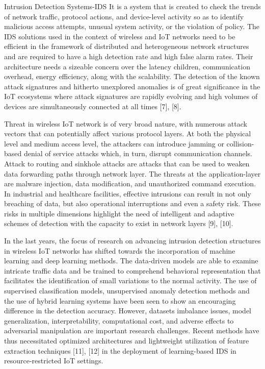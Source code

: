 \documentclass[12pt]{article}
\begin{document}
Intrusion Detection Systems-IDS It is a system that is created to check the trends of network traffic, protocol actions, and device-level activity so as to identify malicious access attempts, unusual system activity, or the violation of policy. The IDS solutions used in the context of wireless and IoT networks need to be efficient in the framework of distributed and heterogeneous network structures and are required to have a high detection rate and high false alarm rates. Their architecture needs a sizeable concern over the latency children, communication overhead, energy efficiency, along with the scalability. The detection of the known attack signatures and hitherto unexplored anomalies is of great significance in the IoT ecosystems where attack signatures are rapidly evolving and high volumes of devices are simultaneously connected at all times [7], [8].



Threat in wireless IoT network is of very broad nature, with numerous attack vectors that can potentially affect various protocol layers. At both the physical level and medium access level, the attackers can introduce jamming or collision-based denial of service attacks which, in turn, disrupt communication channels. Attack to routing and sinkhole attacks are attacks that can be used to weaken data forwarding paths through network layer. The threats at the application-layer are malware injection, data modification, and unauthorized command execution. In industrial and healthcare facilities, effective intrusions can result in not only breaching of data, but also operational interruptions and even a safety risk. These risks in multiple dimensions highlight the need of intelligent and adaptive schemes of detection with the capacity to exist in network layers [9], [10].



In the last years, the focus of research on advancing intrusion detection structures in wireless IoT networks has shifted towards the incorporation of machine learning and deep learning methods. The data-driven models are able to examine intricate traffic data and be trained to comprehend behavioral representation that facilitates the identification of small variations to the normal activity. The use of supervised classification models, unsupervised anomaly detection methods and the use of hybrid learning systems have been seen to show an encouraging difference in the detection accuracy. However, datasets imbalance issues, model generalization, interpretability, computational cost, and adverse effects to adversarial manipulation are important research challenges. Recent methods have thus necessitated optimized architectures and lightweight utilization of feature extraction techniques [11], [12] in the deployment of learning-based IDS in resource-restricted IoT settings.
\end{document}
